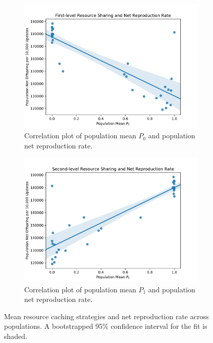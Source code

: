 \begin{figure}[t]
\begin{center}

\begin{subfigure}[b]{0.5\columnwidth}
  \includegraphics[width=\columnwidth]{img/mean_res_pool1_vs_net_reproduction}
  \caption{
  Correlation plot of population mean $P_0$ and population net reproduction rate.
  }
  \label{fig:mean_res_pool1_vs_net_reproduction}
\end{subfigure}%
\begin{subfigure}[b]{0.5\columnwidth}
  \includegraphics[width=\columnwidth]{img/mean_res_pool2_vs_net_reproduction}
  \caption{
  Correlation plot of population mean $P_1$ and population net reproduction rate.
  }
  \label{fig:mean_res_pool2_vs_net_reproduction}
\end{subfigure}
\caption{
Mean resource caching strategies and net reproduction rate across populations.
A bootstrapped 95\% confidence interval for the fit is shaded.
}
\label{fig:net_reproduction}
\end{center}
\end{figure}
